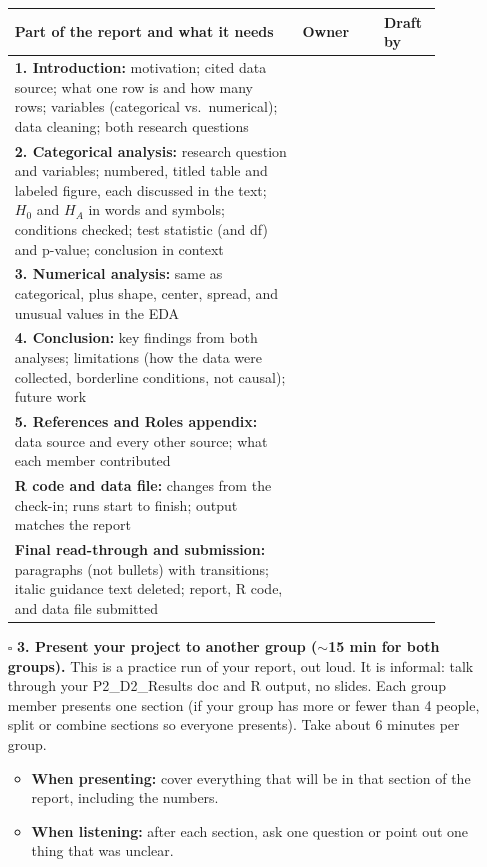 \documentclass[12pt]{article}
\begin{document}
\begin{enumerate}
    \vspace{4pt}
    {\renewcommand{\arraystretch}{1.4}
    \noindent\begin{tabular}{>{\raggedright\arraybackslash}p{0.6\linewidth}|p{0.17\linewidth}|p{0.12\linewidth}}
    \toprule
    \textbf{Part of the report and what it needs} & \textbf{Owner} & \textbf{Draft by} \\
    \midrule
    \textbf{1. Introduction:} motivation; cited data source; what one row is and how many rows; variables (categorical vs.\ numerical); data cleaning; both research questions & & \\
    \hline
    \textbf{2. Categorical analysis:} research question and variables; numbered, titled table and labeled figure, each discussed in the text; $H_0$ and $H_A$ in words and symbols; conditions checked; test statistic (and df) and p-value; conclusion in context & & \\
    \hline
    \textbf{3. Numerical analysis:} same as categorical, plus shape, center, spread, and unusual values in the EDA & & \\
    \hline
    \textbf{4. Conclusion:} key findings from both analyses; limitations (how the data were collected, borderline conditions, not causal); future work & & \\
    \hline
    \textbf{5. References and Roles appendix:} data source and every other source; what each member contributed & & \\
    \hline
    \textbf{R code and data file:} changes from the check-in; runs start to finish; output matches the report & & \\
    \hline
    \textbf{Final read-through and submission:} paragraphs (not bullets) with transitions; italic guidance text deleted; report, R code, and data file submitted & & \\
    \bottomrule
    \end{tabular}}

    \item[$\square$] \textbf{3. Present your project to another group ($\sim$15 min for both groups).} This is a practice run of your report, out loud. It is informal: talk through your P2\_D2\_Results doc and R output, no slides. Each group member presents one section (if your group has more or fewer than 4 people, split or combine sections so everyone presents). Take about 6 minutes per group.
    \begin{itemize}[nosep]
        \item \textbf{When presenting:} cover everything that will be in that section of the report, including the numbers.
        \item \textbf{When listening:} after each section, ask one question or point out one thing that was unclear.
    \end{itemize}


\end{enumerate}
\end{document}
